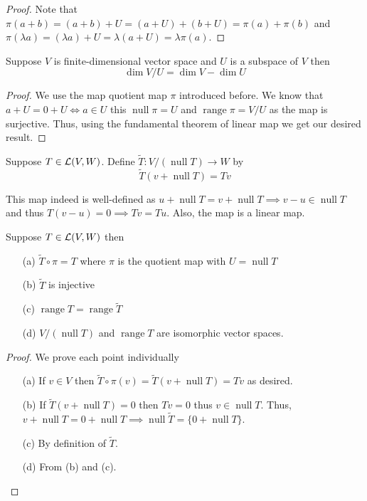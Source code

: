 \begin{proof}
    Note that $\pi(a+b)=(a+b)+U=(a+U)+(b+U)=\pi(a)+\pi(b)$ and $\pi(\lambda a) = (\lambda a) + U = \lambda(a+U) = \lambda \pi(a)$. 
\end{proof}

\begin{proposition}
    Suppose $V$ is finite-dimensional vector space and $U$ is a subspace of $V$ then
    \[ \dim V/U  = \dim V - \dim U\]
\end{proposition}

\begin{proof}
    We use the map quotient map $\pi$ introduced before. We know that $a+U = 0+U \iff a \in U$ this $\operatorname{null} \pi = U$ and 
    $\operatorname{range} \pi = V/U$ as the map is surjective. Thus, using the fundamental theorem of linear map we get our desired result. 
\end{proof}

\begin{definition}
    Suppose $T \in \operatorname{\mathcal{L}}(V,W)$. Define $\widetilde{T} : V/(\operatorname{null} T) \to W$ by
    \[ \widetilde{T}(v+\operatorname{null} T) = Tv \]
\end{definition}

This map indeed is well-defined as $u+\operatorname{null} T = v + \operatorname{null} T \implies v-u \in \operatorname{null} T$ and thus
$T(v-u) = 0 \implies Tv=Tu$. Also, the map is a linear map.


\begin{proposition}
    Suppose $T \in \operatorname{\mathcal{L}}(V,W)$ then
    \begin{enumerate}
        \item[(a)] $\widetilde{T} \circ \pi = T$ where $\pi$ is the quotient map with $U=\operatorname{null} T$
        \item[(b)] $\widetilde{T}$ is injective
        \item[(c)] $\operatorname{range} T = \operatorname{range} \widetilde{T}$
        \item[(d)] $V/(\operatorname{null} T)$ and $\operatorname{range} T $ are isomorphic vector spaces.   
    \end{enumerate}
\end{proposition}

\begin{proof} We prove each point individually 
    \begin{enumerate}
        \item[(a)] If $v \in V$ then $\widetilde{T} \circ \pi (v) = \widetilde{T}(v+\operatorname{null} T) = Tv$ as desired.
        \item[(b)] If $\widetilde{T}(v+\operatorname{null} T )=0$ then $Tv=0$ thus $v \in \operatorname{null} T $. Thus,
            $v+\operatorname{null} T = 0 + \operatorname{null} T \implies \operatorname{null} \widetilde{T} = \{0+\operatorname{null} T\}$.
        \item[(c)] By definition of $\widetilde{T}$.
        \item[(d)] From (b) and (c).  
    \end{enumerate}
\end{proof}

